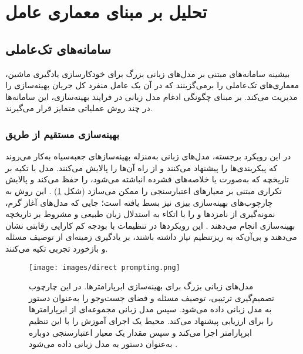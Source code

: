 
\section{تحلیل بر مبنای معماری عامل}
\subsection{سامانه‌های تک‌عاملی}

بیشینه سامانه‌های مبتنی بر مدل‌های زبانی بزرگ برای خودکارسازی یادگیری ماشین، معماری‌های تک‌عاملی را برمی‌گزینند که در آن یک عامل منفرد کل جریان بهینه‌سازی را مدیریت می‌کند. بر مبنای چگونگی ادغام مدل زبانی در فرایند بهینه‌سازی، این سامانه‌ها در چند روش عملیاتی متمایز قرار می‌گیرند.

\subsubsection{بهینه‌سازی مستقیم از طریق \protect{}}
در این رویکرد برجسته، مدل‌های زبانی به‌منزله بهینه‌سازهای جعبه‌سیاه به‌کار می‌روند که پیکربندی‌ها را پیشنهاد می‌کنند و از راه  آن‌ها را پالایش می‌کنند. مدل با تکیه بر تاریخچه  که به‌صورت  یا خلاصه‌های فشرده انباشته می‌شود،  را حفظ می‌کند و پالایش تکراری مبتنی بر معیارهای اعتبارسنجی را ممکن می‌سازد (شکل \ref{fig:llm-hpo}) \cite{zhang2023usingLLMforHPO, zheng2023GENIUS}. این روش به چارچوب‌های بهینه‌سازی بیزی نیز بسط یافته است؛ جایی که مدل‌های آغاز گرم، نمونه‌گیری از نامزدها و  را با اتکاء به استدلال زبان طبیعی و مشروط بر تاریخچه بهینه‌سازی انجام می‌دهند \cite{liu2024LLAMBO}. این رویکردها در تنظیمات با بودجه کم کارایی رقابتی نشان می‌دهند و بی‌آن‌که به ریزتنظیم نیاز داشته باشند، بر یادگیری زمینه‌ای از توصیف مسئله و بازخورد تجربی تکیه می‌کنند.
\begin{figure}[h]
    \centerline{\texttt{[image: images/direct prompting.png]}}
    \caption[مدل زبانیها برای بهینه‌سازی ابرپارامترها]{مدل‌های زبانی بزرگ برای بهینه‌سازی ابرپارامترها. در این چارچوب تصمیم‌گیری ترتیبی، توصیف مسئله و فضای جست‌وجو را به‌عنوان دستور به مدل زبانی داده می‌شود. سپس مدل زبانی مجموعه‌ای از ابرپارامترها را برای ارزیابی پیشنهاد می‌کند. محیط یک اجرای آموزش را با این تنظیم ابرپارامتر اجرا می‌کند و سپس مقدار یک معیار اعتبارسنجی دوباره به‌عنوان دستور به مدل زبانی داده می‌شود \cite{zhang2023usingLLMforHPO}.}
    \label{fig:llm-hpo}
\end{figure}
